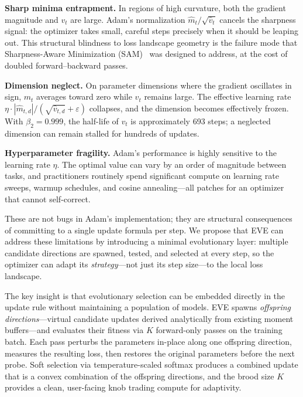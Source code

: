 \documentclass[12pt]{article}
\begin{document}
\textbf{Sharp minima entrapment.}
In regions of high curvature, both the gradient magnitude and $v_t$
are large.
Adam's normalization $\hat{m}_t / \sqrt{\hat{v}_t}$ cancels the
sharpness signal: the optimizer takes small, careful steps precisely
when it should be leaping out.
This structural blindness to loss landscape geometry is the failure mode
that Sharpness-Aware Minimization (SAM)~\cite{foret2021sharpnessaware}
was designed to address, at the cost of doubled forward--backward passes.

\textbf{Dimension neglect.}
On parameter dimensions where the gradient oscillates in sign, $m_t$
averages toward zero while $v_t$ remains large.
The effective learning rate
$\eta \cdot |\hat{m}_{t,d}| / (\sqrt{\hat{v}_{t,d}} + \varepsilon)$
collapses, and the dimension becomes effectively frozen.
With $\beta_2 = 0.999$, the half-life of $v_t$ is approximately
693 steps; a neglected dimension can remain stalled for hundreds of
updates.

\textbf{Hyperparameter fragility.}
Adam's performance is highly sensitive to the learning rate $\eta$.
The optimal value can vary by an order of magnitude between tasks,
and practitioners routinely spend significant compute on learning rate
sweeps, warmup schedules, and cosine annealing---all patches for an
optimizer that cannot self-correct.

\medskip

These are not bugs in Adam's implementation; they are structural
consequences of committing to a single update formula per step.
We propose that EVE can address these limitations by introducing a minimal evolutionary layer:
multiple candidate directions are spawned, tested, and selected at
every step, so the optimizer can adapt its \emph{strategy}---not just
its step size---to the local loss landscape.

The key insight is that evolutionary selection can be embedded directly
in the update rule without maintaining a population of models.
EVE spawns \emph{offspring directions}---virtual candidate updates
derived analytically from existing moment buffers---and evaluates their
fitness via $K$ forward-only passes on the training batch.
Each pass perturbs the parameters in-place along one offspring direction,
measures the resulting loss, then restores the original parameters before
the next probe.
Soft selection via temperature-scaled softmax produces a combined
update that is a convex combination of the offspring directions,
and the brood size $K$ provides
a clean, user-facing knob trading compute for adaptivity.
\end{document}
